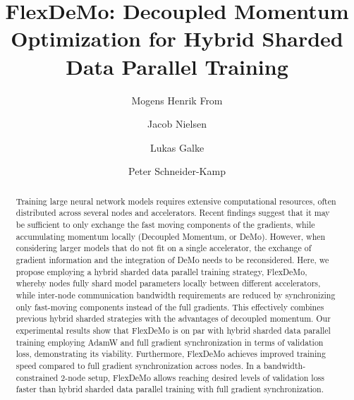 \documentclass[runningheads]{llncs}
\begin{document}
\title{FlexDeMo: Decoupled Momentum Optimization for Hybrid Sharded Data Parallel Training}


\author{Mogens Henrik From \and Jacob Nielsen \and Lukas Galke \and Peter Schneider-Kamp}




\maketitle              %

\begin{abstract}
Training large neural network models requires extensive computational resources, often distributed across several nodes and accelerators. Recent findings suggest that it may be sufficient to only exchange the fast moving components of the gradients, while accumulating momentum locally (Decoupled Momentum, or DeMo). However, when considering larger models that do not fit on a single accelerator, the exchange of gradient information and the integration of DeMo needs to be reconsidered. Here, we propose employing a hybrid sharded data parallel training strategy, FlexDeMo, whereby nodes fully shard model parameters locally between different accelerators, while inter-node communication bandwidth requirements are reduced by synchronizing only fast-moving components instead of the full gradients. This effectively combines previous hybrid sharded strategies with the advantages of decoupled momentum. Our experimental results show that FlexDeMo is on par with hybrid sharded data parallel training employing AdamW and full gradient synchronization in terms of validation loss, demonstrating its viability. Furthermore, FlexDeMo achieves improved training speed compared to full gradient synchronization across nodes. In a bandwidth-constrained 2-node setup, FlexDeMo allows reaching desired levels of validation loss faster than hybrid sharded data parallel training with full gradient synchronization.

\end{abstract}
\end{document}
